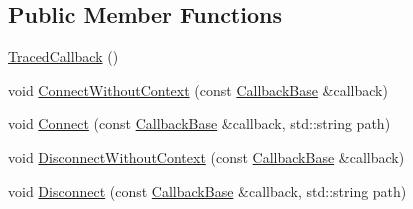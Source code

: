 \subsection*{Public Member Functions}
\begin{DoxyCompactItemize}
\item 
\hyperlink{classns3_1_1TracedCallback_a4aa354a361b2ace99ed5f21f256d389a}{Traced\+Callback} ()
\item 
void \hyperlink{classns3_1_1TracedCallback_aacc251bf4e302e7d034e9f0e25a15980}{Connect\+Without\+Context} (const \hyperlink{classns3_1_1CallbackBase}{Callback\+Base} \&callback)
\item 
void \hyperlink{classns3_1_1TracedCallback_a340d63502c94d097541c48b54b3ff16e}{Connect} (const \hyperlink{classns3_1_1CallbackBase}{Callback\+Base} \&callback, std\+::string path)
\item 
void \hyperlink{classns3_1_1TracedCallback_ad16d7d92a245c739670d968ab469c631}{Disconnect\+Without\+Context} (const \hyperlink{classns3_1_1CallbackBase}{Callback\+Base} \&callback)
\item 
void \hyperlink{classns3_1_1TracedCallback_a65753e64f351b71a2c7016fb493b3c60}{Disconnect} (const \hyperlink{classns3_1_1CallbackBase}{Callback\+Base} \&callback, std\+::string path)
\end{DoxyCompactItemize}

